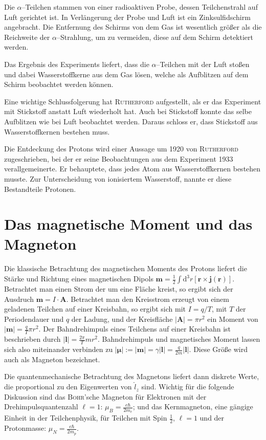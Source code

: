 \documentclass[sn-mathphys-num,iicol]{sn-jnl}
\theoremstyle{thmstyleone}
\theoremstyle{thmstyletwo}
\theoremstyle{thmstylethree}
\newcommand{\td}{\text{d}}
\begin{document}
Die $\alpha $--Teilchen stammen von einer radioaktiven Probe, dessen Teilchenstrahl auf Luft gerichtet ist.
In Verlängerung der Probe und Luft ist ein Zinksulfidschirm angebracht.
Die Entfernung des Schirms von dem Gas ist wesentlich größer als die Reichweite der $\alpha $--Strahlung, um zu vermeiden, diese auf dem Schirm detektiert werden.

Das Ergebnis des Experiments liefert, dass die $\alpha $--Teilchen mit der Luft stoßen und dabei Wasserstoffkerne aus dem Gas lösen, welche als Aufblitzen auf dem Schirm beobachtet werden können.

Eine wichtige Schlussfolgerung hat \textsc{Rutherford} aufgestellt, als er das Experiment mit Stickstoff anstatt Luft wiederholt hat.
Auch bei Stickstoff konnte das selbe Aufblitzen wie bei Luft beobachtet werden.
Daraus schloss er, dass Stickstoff aus Wasserstoffkernen bestehen muss.

Die Entdeckung des Protons wird einer Aussage um 1920 von \textsc{Rutherford} zugeschrieben, bei der er seine Beobachtungen aus dem Experiment 1933 verallgemeinerte.
Er behauptete, dass jedes Atom aus Wasserstoffkernen bestehen musste.
Zur Unterscheidung von ionisiertem Wasserstoff, nannte er diese Bestandteile Protonen.\cite{Rutherford_proton_discovery}\cite{Rutherford1919}

\section{Das magnetische Moment und das Magneton}
Die klassische Betrachtung des magnetischen Moments des Protons liefert die Stärke und Richtung eines magnetischen Dipols $\boldsymbol{m}=\tfrac{1}{2}\int\td ^3r\left[\boldsymbol{r} \times \boldsymbol{j} \left(\boldsymbol{r} \right)\right]$.
Betrachtet man einen Strom der um eine Fläche kreist, so ergibt sich der Ausdruch $\boldsymbol{m} =I\cdot \boldsymbol{A} $.
Betrachtet man den Kreisstrom erzeugt von einem geladenen Teilchen auf einer Kreisbahn, so ergibt sich mit $I=q/T$, mit $T$ der Periodendauer und $q$ der Ladung, und der Kreisfläche $|\boldsymbol{A} |=\pi r^2$ ein Moment von $|\boldsymbol{m} |=\tfrac{q}{T}\pi r^2$.
Der Bahndrehimpuls eines Teilchens auf einer Kreisbahn ist beschrieben durch $|\boldsymbol{l} |=\tfrac{2\pi }{T}mr^2$.
Bahndrehimpuls und magnetisches Moment lassen sich also miteinander verbinden zu $|\boldsymbol{\mu } |:=|\boldsymbol{m} |=\gamma |\boldsymbol{l} |=\tfrac{q}{2m}|\boldsymbol{l} |$.
Diese Größe wird auch als Magneton bezeichnet.

Die quantenmechanische Betrachtung des Magnetons liefert dann diskrete Werte, die proportional zu den Eigenwerten von $\hat{l}_z$ sind.
Wichtig für die folgende Diskussion sind das \textsc{Bohr}'sche Magneton für Elektronen mit der Drehimpulsquantenzahl $\ell=1$: $\mu _B=\tfrac{e\hbar }{2m_e}$; und das Kernmagneton, eine gängige Einheit in der Teilchenphysik, für Teilchen mit Spin $\tfrac{1}{2}$, $\ell=1$ und der Protonmasse: $\mu _N=\tfrac{e\hbar }{2m_p}$.
\end{document}
